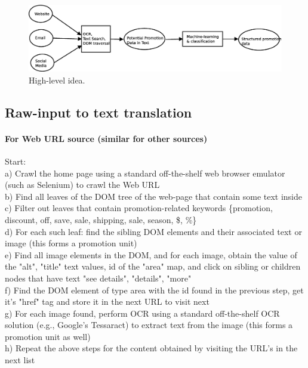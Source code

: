 \documentclass[11pt]{article}
\begin{document}
\begin{figure}[htbp]
\begin{center}
\includegraphics[width=\textwidth]{claim1}
\caption{High-level idea.}
\label{fig:claim1}
\end{center}
\end{figure}



\subsection{Raw-input to text translation}

\paragraph{For Web URL source (similar for other sources)} Start:\\
a) Crawl the home page using a standard off-the-shelf web browser emulator (such as Selenium) to crawl the Web URL\\
b) Find all leaves of the DOM tree of the web-page that contain some text inside\\
c) Filter out leaves that contain promotion-related keywords \{promotion, discount, off, save, sale, shipping, sale, season, \$, \%\}\\
d) For each such leaf: find the sibling DOM elements and their associated text or image (this forms a promotion unit)\\
e) Find all image elements in the DOM, and for each image, obtain the value of the "alt", "title" text values, id of the "area" map, and click on sibling or children nodes that have text "see details", "details", "more"\\
f) Find the DOM element of type area with the id found in the previous step, get it's "href" tag and store it in the next URL to visit next\\
g) For each image found, perform OCR using a standard off-the-shelf OCR solution (e.g., Google's Tessaract) to extract text from the image (this forms a promotion unit as well)\\
h) Repeat the above steps for the content obtained by visiting the URL's in the next list
\end{document}
